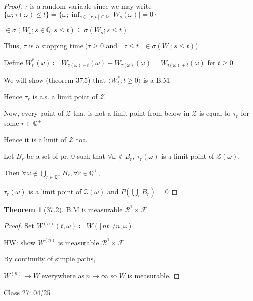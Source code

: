 \documentclass{article}
\theoremstyle{definition}
\newtheorem{theorem}{Theorem}
\begin{document}
\begin{proof}
    \(\tau\) is a random variable since we may write \(\{ \omega ; \tau(\omega) \leq t\} = \{ \omega; \inf_{s\in [r,t]\cap\mathbb{Q}} \vert W_s(\omega) \vert = 0 \}  \)  

    \(\in \sigma(W_s ; s\in \mathbb{Q} , s \leq t)\subseteq \sigma(W_s ; s \leq t)\) 

    Thus, \(\tau\) is a \underline{stopping time} (\(\tau \geq 0\) and \([\tau \leq t]\in \sigma (W_s; s \leq t)\)) 

    Define \(W_t^{\ast}(\omega) \coloneqq W_{\tau(\omega)+t}(\omega) - W_{\tau(\omega)}(\omega) = W_{\tau(\omega)+t}(\omega)\) for \(t \geq 0\)  

    We will show (theorem 37.5) that \(\langle W_t ^{\ast} ; t \geq 0 \rangle \) is a B.M.

    Hence \(\tau_r\) is a.s. a limit point of \(\mathscr{Z}\)  

    Now, every point of \(\mathscr{Z}\) that is not a limit point from below in \(\mathscr{Z}\) is equal to \(\tau_r\) for some \(r\in\mathbb{Q}^+\)
    
    Hence it is a limit of \(\mathscr{Z}\) too.
    
    Let \(B_r\) be a set of pr. \(0\) such that \(\forall \omega \notin B_r\), \(\tau_r(\omega)\) is a limit point of \(\mathscr{Z}(\omega)\).
    
    Then \(\forall \omega \notin \bigcup_{r\in\mathbb{Q}^+}B_r, \forall r\in\mathbb{Q}^+,\)
    
    \(\tau_r(\omega)\) is a limit point of \(\mathscr{Z}(\omega)\) and \(P(\bigcup_r B_r) = 0\)   

\end{proof}

\begin{theorem}
    [37.2] B.M is measurable \(\mathcal{R}^1 \times \mathscr{F}\) 
\end{theorem}

\begin{proof}
    Set \(W^{(n)}(t,\omega) \coloneqq  W(\lfloor n t \rfloor / n, \omega)\)
    
    HW: show \(W^{(n)}\) is measurable \(\mathcal{R}^1 \times \mathscr{F}\)
    
    By continuity of simple paths,

    \(W^{(n)} \to W\) everywhere as \(n \to \infty\) so \(W\) is measurable.  
\end{proof}

\hrulefill

Class 27: 04/25
\end{document}
